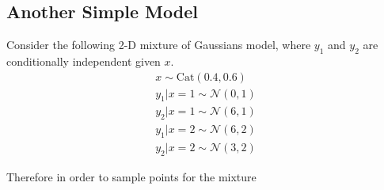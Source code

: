 \subsection{Another Simple Model}
Consider the following 2-D mixture of Gaussians model, where $y_{1}$ and $y_{2}$ are conditionally independent given $x$. 
\begin{align}
x \sim \text{Cat}(0.4,0.6)\\
y_{1} | x = 1 \sim \mathcal{N}(0,1)\\
y_{2} | x = 1 \sim \mathcal{N}(6,1)\\
y_{1} | x = 2 \sim \mathcal{N}(6,2)\\
y_{2} | x = 2 \sim \mathcal{N}(3,2)
\end{align}

Therefore in order to sample points for the mixture 
